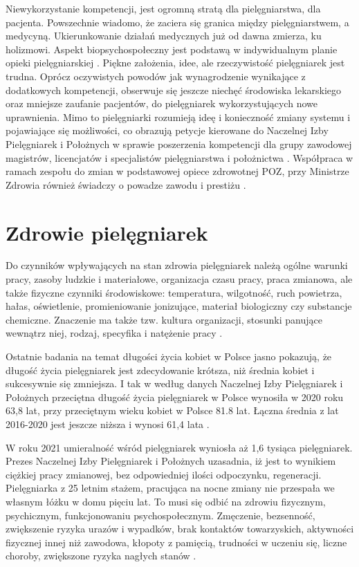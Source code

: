 \documentclass[a4paper,12pt,twoside,openany]{report}
\begin{document}
Niewykorzystanie  kompetencji, jest ogromną stratą dla pielęgniarstwa, dla pacjenta. Powszechnie wiadomo, że zaciera się granica między pielęgniarstwem, a medycyną. Ukierunkowanie działań medycznych już od dawna zmierza, ku holizmowi. Aspekt biopsychospołeczny jest podstawą w indywidualnym planie opieki pielęgniarskiej \cite{dorota}. Piękne założenia, idee, ale rzeczywistość pielęgniarek jest trudna. Oprócz oczywistych powodów jak wynagrodzenie wynikające z dodatkowych kompetencji, obserwuje się jeszcze niechęć środowiska lekarskiego oraz mniejsze zaufanie pacjentów, do pielęgniarek wykorzystujących nowe uprawnienia. Mimo to pielęgniarki rozumieją ideę i konieczność zmiany systemu i  pojawiające się możliwości, co obrazują petycje kierowane do Naczelnej Izby Pielęgniarek i Położnych w sprawie poszerzenia kompetencji dla grupy zawodowej magistrów, licencjatów i specjalistów pielęgniarstwa i położnictwa \cite{petycja}. Współpraca w ramach zespołu do zmian w podstawowej opiece zdrowotnej POZ, przy Ministrze Zdrowia również świadczy o powadze zawodu i prestiżu \cite{poz}.

\section{Zdrowie pielęgniarek}
\label{sectionZdrowiePielegniarek}
Do czynników wpływających na stan zdrowia pielęgniarek należą ogólne warunki pracy, zasoby ludzkie i materiałowe, organizacja czasu pracy,  praca zmianowa, ale także fizyczne czynniki środowiskowe: temperatura, wilgotność, ruch powietrza, hałas, oświetlenie, promieniowanie jonizujące, materiał biologiczny czy substancje chemiczne. Znaczenie ma także tzw. kultura organizacji, stosunki panujące wewnątrz niej, rodzaj, specyfika i natężenie pracy \cite{obciazenia}.

Ostatnie badania na temat długości życia kobiet w Polsce jasno pokazują, że długość życia pielęgniarek jest zdecydowanie krótsza, niż średnia kobiet i sukcesywnie się zmniejsza. I tak w według danych Naczelnej Izby Pielęgniarek i Położnych przeciętna długość życia pielęgniarek w Polsce wynosiła w 2020 roku 63,8 lat, przy przeciętnym wieku kobiet w Polsce 81.8 lat. Łączna średnia z lat 2016-2020 jest jeszcze niższa i wynosi 61,4 lata \cite{statystyka}.

W roku 2021 umieralność wśród pielęgniarek wyniosła aż 1,6 tysiąca pielęgniarek. Prezes Naczelnej Izby Pielęgniarek i Położnych uzasadnia, iż jest to wynikiem ciężkiej pracy zmianowej, bez odpowiedniej ilości odpoczynku, regeneracji. Pielęgniarka z 25 letnim stażem, pracująca na nocne zmiany nie przespała we własnym łóżku w domu pięciu lat. To musi się odbić na zdrowiu fizycznym, psychicznym, funkcjonowaniu psychospołecznym. Zmęczenie, bezsenność, zwiększenie ryzyka urazów i wypadków, brak kontaktów towarzyskich, aktywności fizycznej innej niż zawodowa, kłopoty z pamięcią, trudności w uczeniu się, liczne choroby, zwiększone ryzyka nagłych stanów \cite{zgony}.
\end{document}
